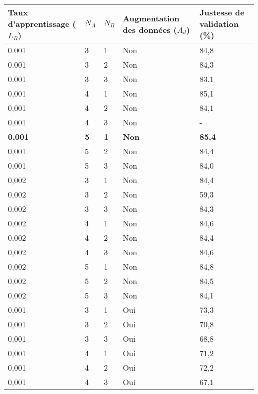     \begin{longtable}{p{4cm}p{1cm}p{1cm}p{3.5cm}p{4cm}}
        \caption{ }\\
        \hline
        Taux d'apprentissage (\(L_R\)) & \(N_A\) & \(N_B\) & Augmentation des données (\(A_d\)) & Justesse de validation (\%) \\
        \hline\hline
        0.001 & 3 & 1 & Non & 84,8\\
        0.001 & 3 & 2 & Non & 84,3\\
        0.001 & 3 & 3 & Non & 83.1\\
        
        0,001 & 4 & 1 & Non & 85,1\\
        0,001 & 4 & 2 & Non & 84,1\\
        0,001 & 4 & 3 & Non & - \\
        
        \textbf{0,001} & \textbf{5} & \textbf{1} & \textbf{Non} & \textbf{85,4}\\
        0,001 & 5 & 2 & Non & 84,4\\
        0,001 & 5 & 3 & Non & 84,0\\
        
        0,002 & 3 & 1 & Non & 84,4\\
        0,002 & 3 & 2 & Non & 59,3\\
        0,002 & 3 & 3 & Non & 84,3\\
        
        0,002 & 4 & 1 & Non & 84,6\\
        0,002 & 4 & 2 & Non & 84,4\\
        0,002 & 4 & 3 & Non & 84,6\\
        
        0,002 & 5 & 1 & Non & 84,8\\
        0,002 & 5 & 2 & Non & 84,5\\
        0,002 & 5 & 3 & Non & 84,1\\
        
        
        0,001 & 3 & 1 & Oui & 73,3\\
        0,001 & 3 & 2 & Oui & 70,8\\
        0,001 & 3 & 3 & Oui & 68,8\\
        
        0,001 & 4 & 1 & Oui & 71,2\\
        0,001 & 4 & 2 & Oui & 72,2\\
        0,001 & 4 & 3 & Oui & 67,1\\
        

\end{longtable}
